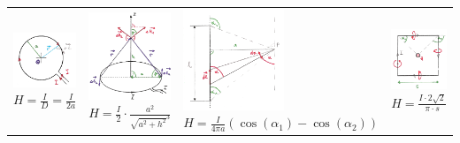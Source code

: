 \begin{tabular}{llll}
\parbox{4.5cm}{
	\includegraphics[width=2.7cm]{./bilder/biot1.png} \\
	$H =\frac{I}{D} = \frac{I}{2a}$}
& \parbox{4.5cm}{
	\includegraphics[width=2.7cm]{./bilder/biot2.png} \\
	$H=\frac{I}{2} \cdot \frac{a^2}{\sqrt{a^2+h^2}^3}$}
& \parbox{4.5cm}{
	\includegraphics[width=3cm]{./bilder/biot3.png} \\
	$H=\frac{I}{4\pi a}(\cos(\alpha_1)- \cos(\alpha_2))$}
& \parbox{4.5cm}{
	\includegraphics[width=2.7cm]{./bilder/biot4.png} \\
	$H= \frac{I \cdot 2 \sqrt{2}}{\pi \cdot s}$ }
\end{tabular}

